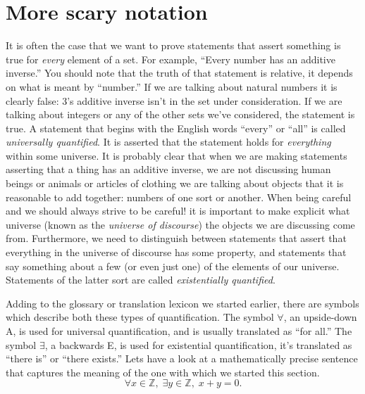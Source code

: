 \documentclass[10pt,]{book}
\theoremstyle{plain}
\theoremstyle{definition}
\theoremstyle{definition}
\numberwithin{equation}{section}
\newcommand{\Integers}{{\mathbb Z}}
\begin{document}
\section[{More scary notation}]{More scary notation}\label{sec_scary}

    It is often the case that we want to prove statements that
    assert something is true for \emph{every} element of a set.
    For example, ``Every number has an additive inverse.''
    You should note that the truth of that statement is relative,
    it depends on what is meant by ``number.'' If we are talking
    about natural numbers it is clearly false: 3's additive
    inverse isn't in the set under consideration. If we are
    talking about integers or any of the other sets we've considered,
    the statement is true. A statement that begins with the English
    words ``every'' or ``all'' is called 
    \emph{universally quantified}.
    It is asserted that the statement holds for \emph{everything} within
    some universe. It is probably clear that when we are making
    statements asserting that a thing has an additive inverse, we
    are not discussing human beings or animals or articles of clothing \textemdash{} we are talking about objects that it is reasonable to add together:
    numbers of one sort or another. When being careful \textemdash{} and we should always
    strive to be careful! \textemdash{} it is important to make explicit what
    universe (known as the \emph{universe of discourse}) the objects
    we are discussing come from. Furthermore, we need to distinguish
    between statements that assert that everything in the universe of
    discourse has some property, and statements that say something
    about a few (or even just one) of the elements of our universe.
    Statements of the latter sort are called 
    \emph{existentially quantified}.
\par

    Adding to the glossary or translation lexicon we started earlier,
    there are symbols which describe both these types of quantification.
    The symbol \(\forall\), an upside-down A, is used for universal
    quantification, and is usually translated as ``for all.''
    The symbol \(\exists\), a backwards E, is used for existential
    quantification, it's translated as ``there is'' or ``there exists.''
    Lets have a look at a mathematically precise sentence that captures
    the meaning of the one with which we started this section.
    \begin{equation*}
      \forall x \in \Integers, \; \exists y \in \Integers, \; x+y=0.
    \end{equation*}
\par
\end{document}
